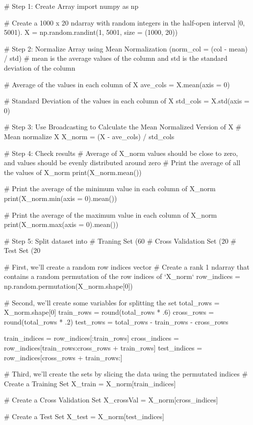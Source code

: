 \begin{python}
	# Step 1: Create Array
	import numpy as np
	
	# Create a 1000 x 20 ndarray with random integers in the half-open interval [0, 5001).
	X = np.random.randint(1, 5001, size = (1000, 20))

	# Step 2: Normalize Array using Mean Normalization (norm_col = (col - mean) / std)
	# mean is the average values of the column and std is the standard deviation of the column
	
	# Average of the values in each column of X
	ave_cols = X.mean(axis = 0)
	
	# Standard Deviation of the values in each column of X
	std_cols = X.std(axis = 0)
	
	# Step 3: Use Broadcasting to Calculate the Mean Normalized Version of X
	# Mean normalize X
	X_norm = (X - ave_cols) / std_cols
	
	# Step 4: Check results
	# Average of X_norm values should be close to zero, and values should be evenly distributed around zero
	# Print the average of all the values of X_norm
	print(X_norm.mean())
	
	# Print the average of the minimum value in each column of X_norm
	print(X_norm.min(axis = 0).mean())
	
	# Print the average of the maximum value in each column of X_norm
	print(X_norm.max(axis = 0).mean())
	
	# Step 5: Split dataset into
	# Traning Set (60%
	# Cross Validation Set (20%
	# Test Set (20%
	
	# First, we'll create a random row indices vector
	# Create a rank 1 ndarray that contains a random permutation of the row indices of `X_norm`
	row_indices = np.random.permutation(X_norm.shape[0])
	
	# Second, we'll create some variables for splitting the set
	total_rows = X_norm.shape[0]
	train_rows = round(total_rows * .6)
	cross_rows = round(total_rows * .2)
	test_rows = total_rows - train_rows - cross_rows
	
	train_indices = row_indices[:train_rows]
	cross_indices = row_indices[train_rows:cross_rows + train_rows]
	test_indices = row_indices[cross_rows + train_rows:]
	
	# Third, we'll create the sets by slicing the data using the permutated indices
	# Create a Training Set
	X_train = X_norm[train_indices]
	
	# Create a Cross Validation Set
	X_crossVal = X_norm[cross_indices]
	
	# Create a Test Set
	X_test = X_norm[test_indices]
\end{python}